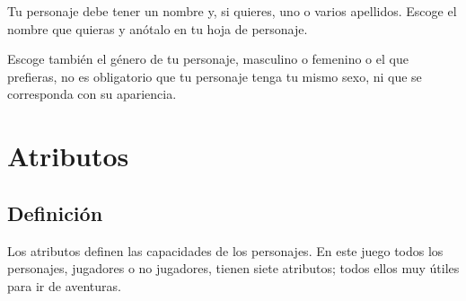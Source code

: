 Tu personaje debe tener un nombre y, si quieres, uno o varios apellidos. Escoge el nombre que quieras y anótalo en tu hoja de personaje. 

Escoge también el género de tu personaje, masculino o femenino o el que prefieras, no es obligatorio que tu personaje tenga tu mismo sexo, ni que se corresponda con su apariencia.

\section{Atributos}

\subsection{Definición}

Los atributos definen las capacidades de los personajes. En este juego todos los personajes, jugadores o no jugadores, tienen siete atributos; todos ellos muy útiles para ir de aventuras.

